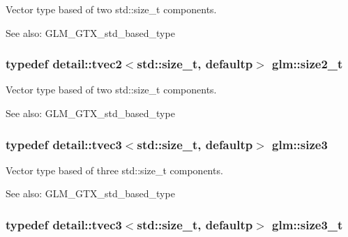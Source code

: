 Vector type based of two std::size\_\-t components. \begin{Desc}
\item[See also:]GLM\_\-GTX\_\-std\_\-based\_\-type \end{Desc}
\hypertarget{group__gtx__std__based__type_g64be170f9203528ff59efa40b1977bb0}{
\subsubsection[size2\_\-t]{\setlength{\rightskip}{0pt plus 5cm}typedef detail::tvec2$<$std::size\_\-t, defaultp$>$ {\bf glm::size2\_\-t}}}
\label{group__gtx__std__based__type_g64be170f9203528ff59efa40b1977bb0}


Vector type based of two std::size\_\-t components. \begin{Desc}
\item[See also:]GLM\_\-GTX\_\-std\_\-based\_\-type \end{Desc}
\hypertarget{group__gtx__std__based__type_ge1dda4cdccd4c1abeeb2e470c048d0c9}{
\subsubsection[size3]{\setlength{\rightskip}{0pt plus 5cm}typedef detail::tvec3$<$std::size\_\-t, defaultp$>$ {\bf glm::size3}}}
\label{group__gtx__std__based__type_ge1dda4cdccd4c1abeeb2e470c048d0c9}


Vector type based of three std::size\_\-t components. \begin{Desc}
\item[See also:]GLM\_\-GTX\_\-std\_\-based\_\-type \end{Desc}
\hypertarget{group__gtx__std__based__type_gd9ddaab6dd4c37ba46b74a1423ef2ba3}{
\subsubsection[size3\_\-t]{\setlength{\rightskip}{0pt plus 5cm}typedef detail::tvec3$<$std::size\_\-t, defaultp$>$ {\bf glm::size3\_\-t}}}
\label{group__gtx__std__based__type_gd9ddaab6dd4c37ba46b74a1423ef2ba3}



